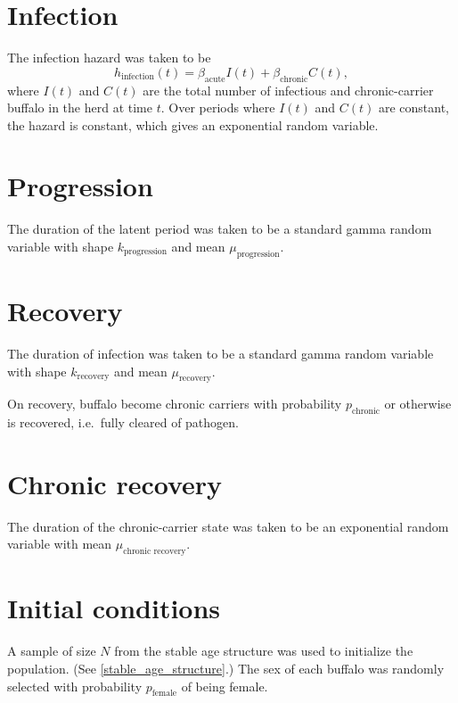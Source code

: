 \documentclass[12pt]{article}
\begin{document}
\section{Infection}

The infection hazard was taken to be
\begin{equation}
  h_{\text{infection}}(t) = \beta_{\text{acute}} I(t) +
  \beta_{\text{chronic}} C(t),
\end{equation}
where $I(t)$ and $C(t)$ are the total number of infectious and
chronic-carrier buffalo in the herd at time $t$.  Over periods where
$I(t)$ and $C(t)$ are constant, the hazard is constant, which gives an
exponential random variable.


\section{Progression}

The duration of the latent period was taken to be a standard gamma
random variable with shape $k_{\text{progression}}$
and mean $\mu_{\text{progression}}$.


\section{Recovery}

The duration of infection was taken to be a standard gamma random
variable with shape $k_{\text{recovery}}$ and mean
$\mu_{\text{recovery}}$.

On recovery, buffalo become chronic carriers with probability
$p_{\text{chronic}}$ or otherwise is recovered, i.e.~fully cleared
of pathogen.


\section{Chronic recovery}

The duration of the chronic-carrier state was taken to be an
exponential random variable with mean
$\mu_{\text{chronic recovery}}$.


\section{Initial conditions}

A sample of size $N$ from the stable age structure was used to
initialize the population.  (See \autoref{stable_age_structure}.)  The
sex of each buffalo was randomly selected with probability
$p_{\text{female}}$ of being female.
\end{document}

